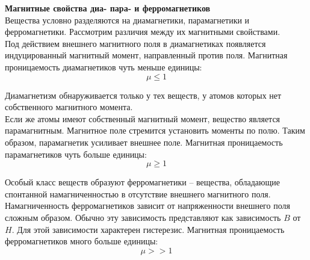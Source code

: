 \documentclass{article}
\begin{document}
	
	\textbf{Магнитные свойства диа- пара- и ферромагнетиков}\\

	Вещества условно разделяются на диамагнетики, парамагнетики и ферромагнетики. Рассмотрим различия между их магнитными свойствами.\\

	Под действием внешнего магнитного поля в диамагнетиках появляется индуцированный магнитный момент, направленный против поля. Магнитная проницаемость диамагнетиков чуть меньше единицы:
	\begin{equation}
		\mu \leq 1
	\end{equation}

	Диамагнетизм обнаруживается только у тех веществ, у атомов которых нет собственного магнитного момента.\\

	Если же атомы имеют собственный магнитный момент, вещество является парамагнитным. Магнитное поле стремится установить моменты по полю. Таким образом, парамагнетик усиливает внешнее поле. Магнитная проницаемость парамагнетиков чуть больше единицы:
	\begin{equation}
		\mu \geq 1
	\end{equation}

	Особый класс веществ образуют ферромагнетики -- вещества, обладающие спонтанной намагниченностью в отсутствие внешнего магнитного поля. Намагниченность ферромагнетиков зависит от напряженности внешнего поля сложным образом. Обычно эту зависимость представляют как зависимость $B$ от $H$. Для этой зависимости характерен гистерезис. Магнитная проницаемость ферромагнетиков много больше единицы:
	\begin{equation}
		\mu >> 1
	\end{equation}
\end{document}
